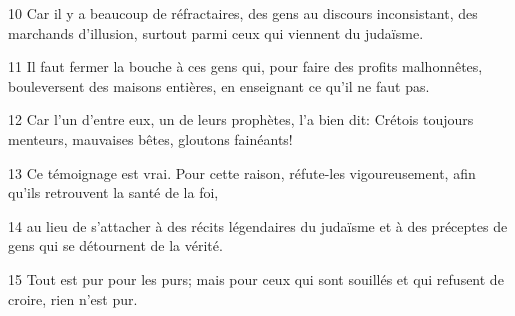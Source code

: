 
10 Car il y a beaucoup de réfractaires, des gens au discours inconsistant, des marchands d’illusion, surtout parmi ceux qui viennent du judaïsme.

11 Il faut fermer la bouche à ces gens qui, pour faire des profits malhonnêtes, bouleversent des maisons entières, en enseignant ce qu’il ne faut pas.

12 Car l’un d’entre eux, un de leurs prophètes, l’a bien dit: Crétois toujours menteurs, mauvaises bêtes, gloutons fainéants!

13 Ce témoignage est vrai. Pour cette raison, réfute-les vigoureusement, afin qu’ils retrouvent la santé de la foi,

14 au lieu de s’attacher à des récits légendaires du judaïsme et à des préceptes de gens qui se détournent de la vérité.

15 Tout est pur pour les purs; mais pour ceux qui sont souillés et qui refusent de croire, rien n’est pur.